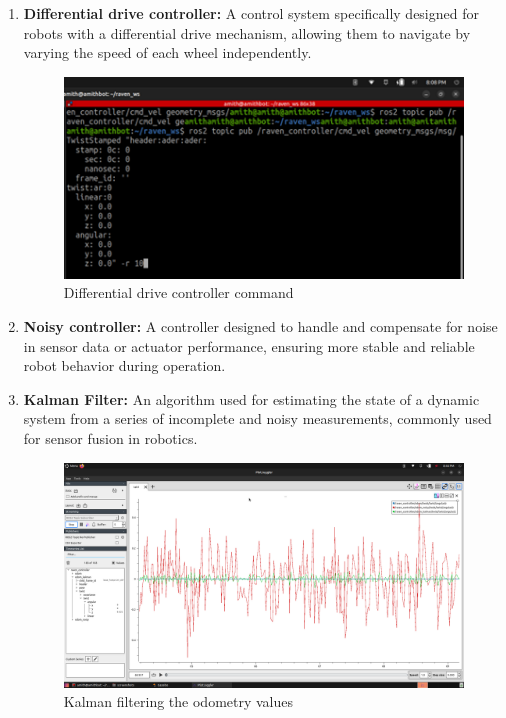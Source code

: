 {\begin{enumerate}[label=\textbf{\arabic*}., leftmargin=*]
		
		\item \textbf{Differential drive controller:} A control system specifically designed for robots with a
		differential drive mechanism, allowing them to navigate by varying the speed of each wheel
		independently.
		
		\begin{figure}[H]
			\centering
			\includegraphics[scale=1.2]{images/Content/Differential_controller_drive}
			\caption{Differential drive controller command}
			\label{fig:differentialcontrollerdrive}
		\end{figure}
		
		
		\item \textbf{Noisy controller:} A controller designed to handle and compensate for noise in sensor data
		or actuator performance, ensuring more stable and reliable robot behavior during operation.
		
		\item \textbf{Kalman Filter:} An algorithm used for estimating the state of a dynamic system from a
		series of incomplete and noisy measurements, commonly used for sensor fusion in robotics.
		
		\begin{figure}[H]
			\centering
			\includegraphics[scale=0.15]{images/Content/KALMAN_MOTION_FILTER}
			\caption{Kalman filtering the odometry values}
			\label{fig:kalmanmotionfilter}
		\end{figure}
		

\end{enumerate}}
